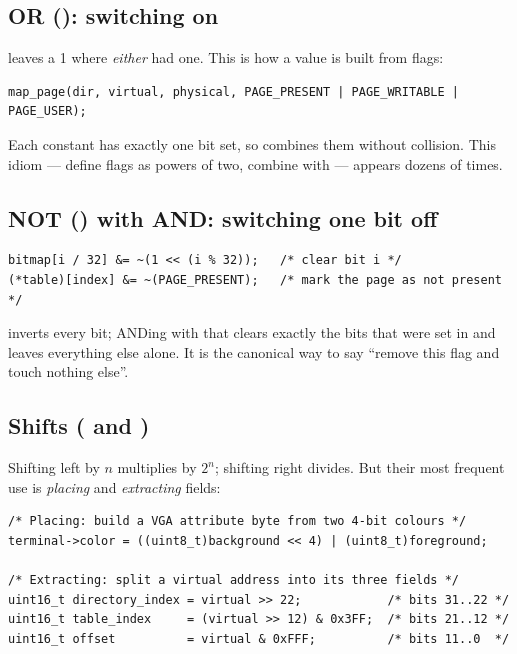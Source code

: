 \subsection{OR (\cod{|}): switching on}

 leaves a 1 where \emph{either} had one. This is how a value is built from flags:

\begin{lstlisting}[style=c]
map_page(dir, virtual, physical, PAGE_PRESENT | PAGE_WRITABLE | PAGE_USER);
\end{lstlisting}

Each constant has exactly one bit set, so \cod{|} combines them without collision. This idiom ---
define flags as powers of two, combine with \cod{|} --- appears dozens of times.

\subsection{NOT (\cod{\textasciitilde}) with AND: switching one bit off}

\begin{lstlisting}[style=c]
bitmap[i / 32] &= ~(1 << (i % 32));   /* clear bit i */
(*table)[index] &= ~(PAGE_PRESENT);   /* mark the page as not present */
\end{lstlisting}

 inverts every bit; ANDing with that clears exactly the bits that were set
in  and leaves everything else alone. It is the canonical way to say ``remove this flag and
touch nothing else''.

\subsection{Shifts (\cod{<<} and \cod{>>})}

Shifting left by $n$ multiplies by $2^n$; shifting right divides. But their most frequent use is
\emph{placing} and \emph{extracting} fields:

\begin{lstlisting}[style=c]
/* Placing: build a VGA attribute byte from two 4-bit colours */
terminal->color = ((uint8_t)background << 4) | (uint8_t)foreground;

/* Extracting: split a virtual address into its three fields */
uint16_t directory_index = virtual >> 22;            /* bits 31..22 */
uint16_t table_index     = (virtual >> 12) & 0x3FF;  /* bits 21..12 */
uint16_t offset          = virtual & 0xFFF;          /* bits 11..0  */
\end{lstlisting}


